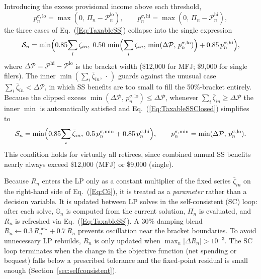\documentclass[fleqn,12pt]{report}
\begin{document}
	Introducing the excess provisional income above each threshold,
	\begin{equation}
		\label{Eq:plo_phi}
		p^{\sigma,\mathrm{lo}}_n = \max(0,\,\Pi_n - \mathcal{P}^{\mathrm{lo}}_n),
		\qquad
		p^{\sigma,\mathrm{hi}}_n = \max(0,\,\Pi_n - \mathcal{P}^{\mathrm{hi}}_n),
	\end{equation}
	the three cases of Eq.~(\ref{Eq:TaxableSS}) collapse into the single expression
	\begin{equation}
		\label{Eq:TaxableSSClosed}
		\mathcal{S}_n =
		\min\Bigl(0.85\!\sum_i\bar{\zeta}_{in},\;
		      0.50\,\min\Bigl(\sum_i\bar{\zeta}_{in},\,
		            \min(\Delta\mathcal{P},\,p^{\sigma,\mathrm{lo}}_n)\Bigr)
		      + 0.85\,p^{\sigma,\mathrm{hi}}_n\Bigr),
	\end{equation}
	where $\Delta\mathcal{P} = \mathcal{P}^{\mathrm{hi}} - \mathcal{P}^{\mathrm{lo}}$
	is the bracket width (\$12{,}000 for MFJ; \$9{,}000 for single filers).
	The inner $\min(\sum_i\bar{\zeta}_{in},\,\cdot\,)$ guards against the unusual case
	$\sum_i\bar{\zeta}_{in} < \Delta\mathcal{P}$, in which SS benefits are too small to
	fill the 50\%-bracket entirely.
	Because the clipped excess $\min(\Delta\mathcal{P},\,p^{\sigma,\mathrm{lo}}_n) \le \Delta\mathcal{P}$,
	whenever $\sum_i\bar{\zeta}_{in} \ge \Delta\mathcal{P}$ the inner $\min$ is
	automatically satisfied and Eq.~(\ref{Eq:TaxableSSClosed}) simplifies to
	\begin{equation}
		\label{Eq:TaxableSSSimpl}
		\mathcal{S}_n =
		\min\Bigl(0.85\!\sum_i\bar{\zeta}_{in},\;
		      0.5\,p^{\sigma,\mathrm{min}}_n + 0.85\,p^{\sigma,\mathrm{hi}}_n\Bigr),
		\qquad
		p^{\sigma,\mathrm{min}}_n = \min(\Delta\mathcal{P},\,p^{\sigma,\mathrm{lo}}_n).
	\end{equation}
	This condition holds for virtually all retirees, since combined annual SS benefits
	nearly always exceed \$12{,}000 (MFJ) or \$9{,}000 (single).

	Because $R_n$ enters the LP only as a constant multiplier of the fixed series
	$\bar{\zeta}_{in}$ on the right-hand side of Eq.~(\ref{Eq:C6}), it is treated as a
	\emph{parameter} rather than a decision variable.
	It is updated between LP solves in the self-consistent (SC) loop:
	after each solve, $\mathbb{G}_n$ is computed from the current solution,
	$\Pi_n$ is evaluated, and $R_n$ is refreshed via Eq.~(\ref{Eq:TaxableSS}).
	A 30\% damping blend
	$R_n \leftarrow 0.3\,R_n^{\mathrm{new}} + 0.7\,R_n$
	prevents oscillation near the bracket boundaries.
	To avoid unnecessary LP rebuilds, $R_n$ is only updated when
	$\max_n|\Delta R_n| > 10^{-3}$.
	The SC loop terminates when the change in the objective function (net spending
	or bequest) falls below a prescribed tolerance and the fixed-point residual is
	small enough (Section~\ref{sec:selfconsistent}).
\end{document}
